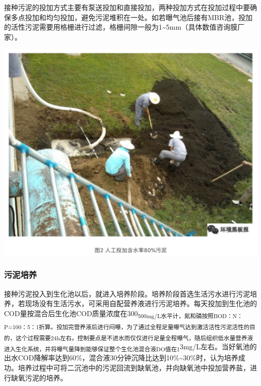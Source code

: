 \documentclass[
]{book}
\begin{document}
接种污泥的投加方式主要有泵送投加和直接投加，两种投加方式在投加过程中要确保多点投加和均匀投加，避免污泥堆积在一处。如若曝气池后接有MBR池，投加的活性污泥需要用格栅进行过滤，格栅间隙一般为1\textasciitilde5mm（具体数值咨询膜厂家）。

\includegraphics[width=6.67in]{images/ao2}

\hypertarget{ux6c61ux6ce5ux57f9ux517b}{%
\subsubsection{污泥培养}\label{ux6c61ux6ce5ux57f9ux517b}}

接种污泥投入到生化池以后，就进入培养阶段。培养阶段首选生活污水进行污泥培养，若现场没有生活污水，可采用自配营养液进行污泥培养。每天投加到生化池的COD量按混合后生化池COD质量浓度在300\textsubscript{500mg/L水平计，氮和磷按照BOD：N：P=100：5：1折算。投加完营养液后进行闷曝，为了通过全程足量曝气达到激活活性污泥活性的目的，这个过程需要24h左右。控制要点是不进水而仅仅进行足量全程曝气，随后组织低水量营养液进入生化系统，并将曝气量降到能够保证整个生化池混合液DO值在1}3mg/L左右。当好氧池的出水COD降解率达到60\%，混合液30分钟沉降比达到10\%\textasciitilde30\%时，认为培养成功。培养过程中可将二沉池中的污泥回流到缺氧池，并向缺氧池中投加营养盐，进行缺氧污泥的培养。
\end{document}
